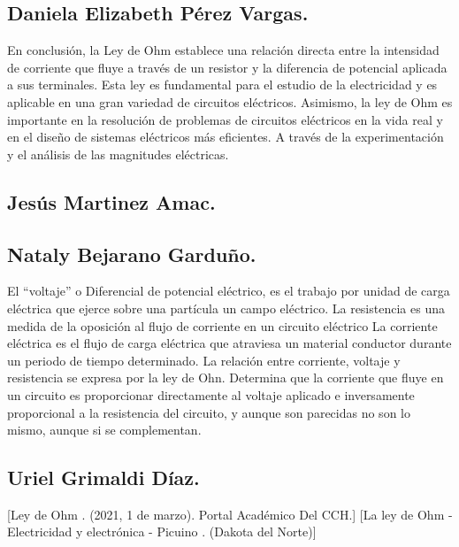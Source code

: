 \documentclass[10pt]{article}
\begin{document}
\begin{multicols}{2}
\subsection*{Daniela Elizabeth Pérez Vargas.}
En conclusión, la Ley de Ohm establece una relación directa entre la intensidad de corriente que fluye a través de un resistor y la diferencia de potencial aplicada a sus terminales. Esta ley es fundamental para el estudio de la electricidad y es aplicable en una gran variedad de circuitos eléctricos. Asimismo, la ley de Ohm es importante en la resolución de problemas de circuitos eléctricos en la vida real y en el diseño de sistemas eléctricos más eficientes. A través de la experimentación y el análisis de las magnitudes eléctricas.
\subsection*{Jesús Martinez Amac.}

\subsection*{Nataly Bejarano Garduño.}
El “voltaje” o Diferencial de potencial eléctrico, es el trabajo por unidad de carga eléctrica que ejerce sobre una partícula un campo eléctrico. La resistencia es una medida de la oposición al flujo de corriente en un circuito eléctrico La corriente eléctrica es el flujo de carga eléctrica que atraviesa un material conductor durante un periodo de tiempo determinado. 
La relación entre corriente, voltaje y resistencia se expresa por la ley de Ohn. Determina que la corriente que fluye en un circuito es proporcionar directamente al voltaje aplicado e inversamente proporcional a la resistencia del circuito, y aunque son parecidas no son lo mismo, aunque si se complementan.

\subsection*{Uriel Grimaldi Díaz.}


\begin{thebibliography}{0}
	[Ley de Ohm . (2021, 1 de marzo). Portal Académico Del CCH.]
	[La ley de Ohm - Electricidad y electrónica - Picuino . (Dakota del Norte)]
		
\end{thebibliography}

\end{multicols}
\end{document}

